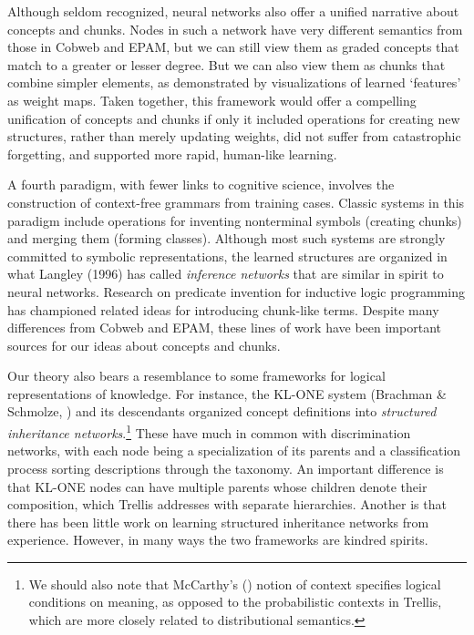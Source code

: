 \documentclass[11pt,letterpaper]{article}
\def\trellis/{{\sc Trellis}}
\begin{document}
Although seldom recognized, neural networks \citep{rumelhart-backprop} also offer a
unified narrative about concepts and chunks. Nodes in such a network
have very different semantics from those in Cobweb and EPAM, but we
can still view them as graded concepts that match to a greater or
lesser degree. But we can also view them as chunks that
combine simpler elements, as demonstrated by visualizations of learned
`features' as weight maps. Taken together, this framework would offer
a compelling unification of concepts and chunks if only it included
operations for creating new structures, rather than merely updating
weights, did not suffer from catastrophic forgetting, and supported 
more rapid, human-like learning.

A fourth paradigm, with fewer links to cognitive science, involves
the construction of context-free grammars from training cases.
Classic systems in this paradigm \citep{grids-langley-stromsten, 
wolff-grammar, wolff2026intelligence} include operations for
inventing nonterminal symbols (creating chunks) and merging them
(forming classes). Although most such systems are strongly committed
to symbolic representations, the learned structures are organized in 
what Langley (1996) has called {\it inference networks\/} that are 
similar in spirit to neural networks. Research on predicate invention
for inductive logic programming \citep{muggleton-buntine-predinvention}
has championed related ideas for introducing chunk-like terms. 
Despite many differences from Cobweb and EPAM, these lines of work 
have been important sources for our ideas about concepts and chunks. 

Our theory also bears a resemblance to some frameworks for logical
representations of knowledge. For instance, the KL-ONE system
(Brachman \& Schmolze, \citeyear{brachman1985overview}) and its 
descendants organized concept definitions into {\it structured 
inheritance networks\/}.\footnote{We should also note that McCarthy's 
(\citeyear{mccarthy1993notes}) notion of context specifies 
logical conditions on meaning, as opposed to the probabilistic
contexts in \trellis/, which are more closely related to
distributional semantics.} These have much in common with
discrimination networks, with each node being a specialization of its
parents and a classification process sorting descriptions through the
taxonomy. An important difference is that KL-ONE nodes can have
multiple parents whose children denote their composition, which
\trellis/ addresses with separate hierarchies. Another is
that there has been little work on learning structured inheritance
networks from experience. However, in many ways the two frameworks 
are kindred spirits. 
\end{document}
